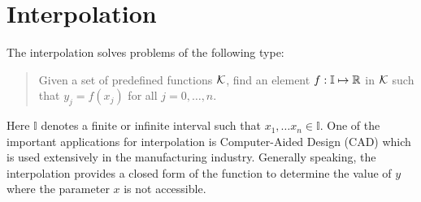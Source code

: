 \chapter{Interpolation}
\label{Ch: 2-Int}

The interpolation solves problems of the following type:

\begin{quotation}
    Given a set of predefined functions $\mathcal K$, find an element $f: \mathbb{I}\mapsto \mathbb R$ in $\mathcal K$ such that
    $y_j = f(x_j)$ for all $j=0,\dots, n$.
\end{quotation}
Here $\mathbb{I}$ denotes a finite or infinite interval such that $x_1,\dots x_n\in \mathbb{I}$. One of the important applications for interpolation is Computer-Aided Design (CAD) which is used extensively in the manufacturing industry. Generally speaking, the interpolation provides a closed form of the function to determine the value of $y$ where the parameter $x$ is not accessible.


